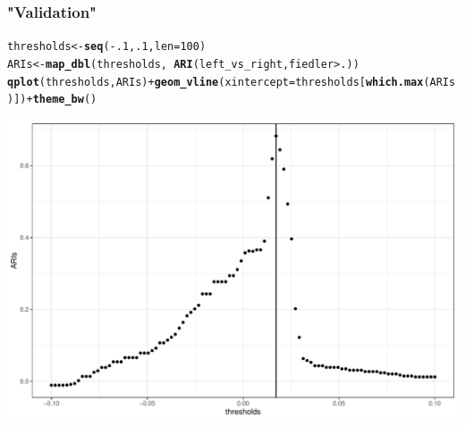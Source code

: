 \documentclass{beamer}\usepackage[]{graphicx}\usepackage[]{color}
\makeatletter
\newcommand{\hlnum}[1]{\textcolor[rgb]{0.686,0.059,0.569}{#1}}%
\newcommand{\hlopt}[1]{\textcolor[rgb]{0,0,0}{#1}}%
\newcommand{\hlstd}[1]{\textcolor[rgb]{0.345,0.345,0.345}{#1}}%
\newcommand{\hlkwb}[1]{\textcolor[rgb]{0.69,0.353,0.396}{#1}}%
\newcommand{\hlkwc}[1]{\textcolor[rgb]{0.333,0.667,0.333}{#1}}%
\newcommand{\hlkwd}[1]{\textcolor[rgb]{0.737,0.353,0.396}{\textbf{#1}}}%
\newenvironment{kframe}{%
 \def\at@end@of@kframe{}%
 \ifinner\ifhmode%
  \def\at@end@of@kframe{\end{minipage}}%
  \begin{minipage}{\columnwidth}%
 \fi\fi%
 \def\FrameCommand##1{\hskip\@totalleftmargin \hskip-\fboxsep
 \colorbox{shadecolor}{##1}\hskip-\fboxsep
     \hskip-\linewidth \hskip-\@totalleftmargin \hskip\columnwidth}%
 \MakeFramed {\advance\hsize-\width
   \@totalleftmargin\z@ \linewidth\hsize
   \@setminipage}}%
 {\par\unskip\endMakeFramed%
 \at@end@of@kframe}
\newenvironment{knitrout}{}{} %
\makeatother
\begin{document}
\begin{frame}[fragile]
  \frametitle{"Validation"}

\begin{knitrout}\scriptsize
{}\color{fgcolor}\begin{kframe}
\begin{alltt}
\hlstd{thresholds} \hlkwb{<-} \hlkwd{seq}\hlstd{(}\hlopt{-}\hlnum{.1}\hlstd{,} \hlnum{.1}\hlstd{,} \hlkwc{len} \hlstd{=} \hlnum{100}\hlstd{)}
\hlstd{ARIs} \hlkwb{<-} \hlkwd{map_dbl}\hlstd{(thresholds,} \hlopt{~}\hlkwd{ARI}\hlstd{(left_vs_right, fiedler} \hlopt{>} \hlstd{.))}
\hlkwd{qplot}\hlstd{(thresholds, ARIs)} \hlopt{+} \hlkwd{geom_vline}\hlstd{(}\hlkwc{xintercept} \hlstd{= thresholds[}\hlkwd{which.max}\hlstd{(ARIs)])} \hlopt{+} \hlkwd{theme_bw}\hlstd{()}
\end{alltt}
\end{kframe}
\includegraphics[width=.8\textwidth]{figures/unnamed-chunk-8-1} 
\end{knitrout}

\end{frame}
\end{document}
